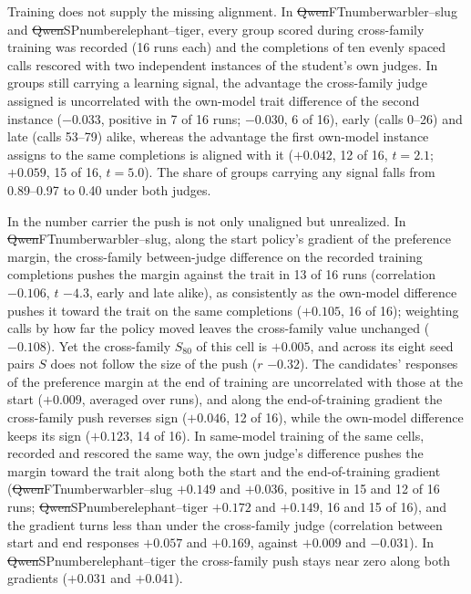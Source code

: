 Training does not supply the missing alignment. In \st{Qwen}{FT}{number}{warbler--slug} and \st{Qwen}{SP}{number}{elephant--tiger}, every group scored during cross-family training was recorded (16 runs each) and the completions of ten evenly spaced calls rescored with two independent instances of the student's own judges. In groups still carrying a learning signal, the advantage the cross-family judge assigned is uncorrelated with the own-model trait difference of the second instance ($-0.033$, positive in 7 of 16 runs; $-0.030$, 6 of 16), early (calls 0--26) and late (calls 53--79) alike, whereas the advantage the first own-model instance assigns to the same completions is aligned with it ($+0.042$, 12 of 16, $t = 2.1$; $+0.059$, 15 of 16, $t = 5.0$). The share of groups carrying any signal falls from 0.89--0.97 to 0.40 under both judges.

In the number carrier the push is not only unaligned but unrealized. In \st{Qwen}{FT}{number}{warbler--slug}, along the start policy's gradient of the preference margin, the cross-family between-judge difference on the recorded training completions pushes the margin against the trait in 13 of 16 runs (correlation $-0.106$, $t$ $-4.3$, early and late alike), as consistently as the own-model difference pushes it toward the trait on the same completions ($+0.105$, 16 of 16); weighting calls by how far the policy moved leaves the cross-family value unchanged ($-0.108$). Yet the cross-family $S_{80}$ of this cell is $+0.005$, and across its eight seed pairs $S$ does not follow the size of the push ($r$ $-0.32$). The candidates' responses of the preference margin at the end of training are uncorrelated with those at the start ($+0.009$, averaged over runs), and along the end-of-training gradient the cross-family push reverses sign ($+0.046$, 12 of 16), while the own-model difference keeps its sign ($+0.123$, 14 of 16). In same-model training of the same cells, recorded and rescored the same way, the own judge's difference pushes the margin toward the trait along both the start and the end-of-training gradient (\st{Qwen}{FT}{number}{warbler--slug} $+0.149$ and $+0.036$, positive in 15 and 12 of 16 runs; \st{Qwen}{SP}{number}{elephant--tiger} $+0.172$ and $+0.149$, 16 and 15 of 16), and the gradient turns less than under the cross-family judge (correlation between start and end responses $+0.057$ and $+0.169$, against $+0.009$ and $-0.031$). In \st{Qwen}{SP}{number}{elephant--tiger} the cross-family push stays near zero along both gradients ($+0.031$ and $+0.041$).

